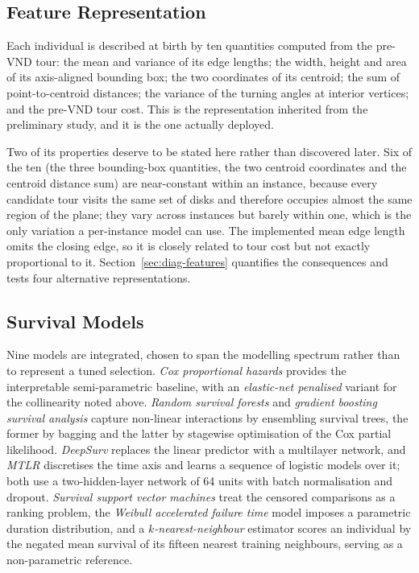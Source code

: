 \documentclass[a4paper,fleqn]{cas-dc}
\begin{document}
\subsection{Feature Representation}\label{sec:fw-features}

Each individual is described at birth by ten quantities computed from the
pre-VND tour: the mean and variance of its edge lengths; the width, height and
area of its axis-aligned bounding box; the two coordinates of its centroid; the
sum of point-to-centroid distances; the variance of the turning angles at
interior vertices; and the pre-VND tour cost. This is the representation
inherited from the preliminary study, and it is the one actually deployed.

Two of its properties deserve to be stated here rather than discovered later.
Six of the ten (the three bounding-box quantities, the two centroid
coordinates and the centroid distance sum) are near-constant within an
instance, because every candidate tour visits the same set of disks and
therefore occupies almost the same region of the plane; they vary across
instances but barely within one, which is the only variation a per-instance
model can use. The implemented mean edge length omits the closing edge, so it is closely
related to tour cost but not exactly proportional to it. Section~\ref{sec:diag-features} quantifies the
consequences and tests four alternative representations.

\subsection{Survival Models}\label{sec:fw-models}

Nine models are integrated, chosen to span the modelling spectrum rather than to
represent a tuned selection. \emph{Cox proportional hazards} provides the
interpretable semi-parametric baseline, with an \emph{elastic-net penalised}
variant for the collinearity noted above. \emph{Random survival forests} and
\emph{gradient boosting survival analysis} capture non-linear interactions by
ensembling survival trees, the former by bagging and the latter by stagewise
optimisation of the Cox partial likelihood. \emph{DeepSurv} replaces the linear
predictor with a multilayer network, and \emph{MTLR} discretises the time axis
and learns a sequence of logistic models over it; both use a two-hidden-layer
network of 64 units with batch normalisation and dropout. \emph{Survival support
vector machines} treat the censored comparisons as a ranking problem, the
\emph{Weibull accelerated failure time} model imposes a parametric duration
distribution, and a \emph{$k$-nearest-neighbour} estimator scores an individual
by the negated mean survival of its fifteen nearest training neighbours, serving
as a non-parametric reference.
\end{document}
